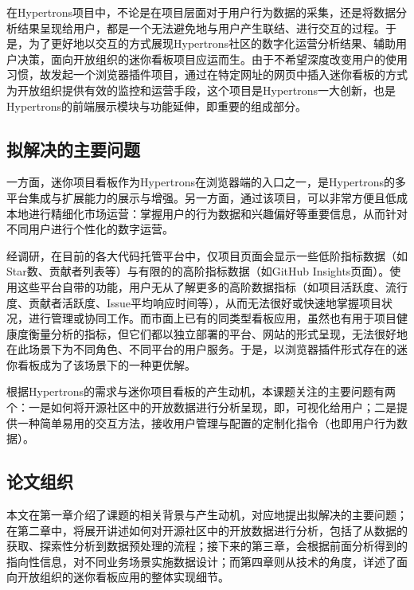 \par 在Hypertrons项目中，不论是在项目层面对于用户行为数据的采集，还是将数据分析结果呈现给用户，都是一个无法避免地与用户产生联结、进行交互的过程。于是，为了更好地以交互的方式展现Hypertrons社区的数字化运营分析结果、辅助用户决策，面向开放组织的迷你看板项目应运而生。由于不希望深度改变用户的使用习惯，故发起一个浏览器插件项目，通过在特定网址的网页中插入迷你看板的方式为开放组织提供有效的监控和运营手段，这个项目是Hypertrons一大创新，也是Hypertrons的前端展示模块与功能延伸，即重要的组成部分。


\subsection{拟解决的主要问题}

\par 一方面，迷你项目看板作为Hypertrons在浏览器端的入口之一，是Hypertrons的多平台集成与扩展能力的展示与增强。另一方面，通过该项目，可以非常方便且低成本地进行精细化市场运营：掌握用户的行为数据和兴趣偏好等重要信息，从而针对不同用户进行个性化的数字运营。

\par 经调研，在目前的各大代码托管平台中，仅项目页面会显示一些低阶指标数据（如Star数、贡献者列表等）与有限的的高阶指标数据（如GitHub Insights页面）。使用这些平台自带的功能，用户无从了解更多的高阶数据指标（如项目活跃度、流行度、贡献者活跃度、Issue平均响应时间等），从而无法很好或快速地掌握项目状况，进行管理或协同工作。而市面上已有的同类型看板应用，虽然也有用于项目健康度衡量分析的指标，但它们都以独立部署的平台、网站的形式呈现，无法很好地在此场景下为不同角色、不同平台的用户服务。于是，以浏览器插件形式存在的迷你看板成为了该场景下的一种更优解。

\par 根据Hypertrons的需求与迷你项目看板的产生动机，本课题关注的主要问题有两个：一是如何将开源社区中的开放数据进行分析呈现，即，可视化给用户；二是提供一种简单易用的交互方法，接收用户管理与配置的定制化指令（也即用户行为数据）。

\subsection{论文组织}

\par 本文在第一章介绍了课题的相关背景与产生动机，对应地提出拟解决的主要问题；在第二章中，将展开讲述如何对开源社区中的开放数据进行分析，包括了从数据的获取、探索性分析到数据预处理的流程；接下来的第三章，会根据前面分析得到的指向性信息，对不同业务场景实施数据设计；而第四章则从技术的角度，详述了面向开放组织的迷你看板应用的整体实现细节。